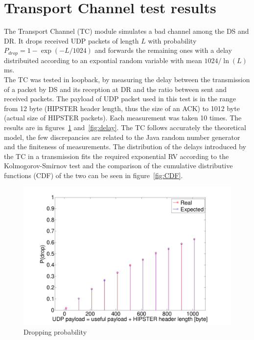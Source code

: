 \documentclass[10pt,twocolumn]{article}
\begin{document}
\section{Transport Channel test results}
The Transport Channel (TC) module simulates a bad channel among the DS and DR. It drops received UDP packets of length $L$ with probability $P_{drop} = 1 - \exp(-L/1024)$ and forwards the remaining ones with a delay distribuited according to an expontial random variable with mean $1024/\ln(L)$ ms. \\
The TC was tested in loopback, by measuring the delay between the transmission of a packet by DS and its reception at DR and the ratio between sent and received packets. The payload of UDP packet used in this test is in the range from 12 byte (HIPSTER header length, thus the size of an ACK) to 1012 byte (actual size of HIPSTER packets). Each measurement was taken 10 times. The results are in figures~\ref{fig:pDrop} and~\ref{fig:delay}. The TC follows accurately the theoretical model, the few discrepancies are related to the Java random number generator and the finiteness of measurements. The distribution of the delays introduced by the TC in a transmission fits the required exponential RV according to the Kolmogorov-Smirnov test and the comparison of the cumulative distributive functions (CDF) of the two can be seen in figure~\ref{fig:CDF}.
\begin{figure}[h]
  \centering
  \includegraphics[width=0.95\columnwidth, keepaspectratio]{tex/images/pdrop.pdf}
  \caption{Dropping probability}
  \label{fig:pDrop}
\end{figure}
\end{document}
